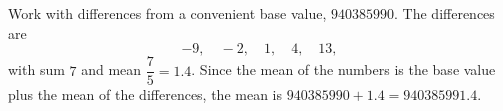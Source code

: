 Work with differences from a convenient base value, $940385990$. The differences are
\[-9,\quad-2,\quad1,\quad4,\quad13,\]
with sum $7$ and mean $\dfrac75=1.4$. Since the mean of the numbers is the base value plus the mean of the differences, the mean is $940385990+1.4=\boxed{940385991.4}$.
